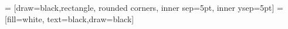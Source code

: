 \documentclass{article}
\begin{document}
\thispagestyle{empty}

 = [draw=black,rectangle, rounded corners, inner sep=5pt, inner ysep=5pt]
 =[fill=white, text=black,draw=black]


\end{document}
